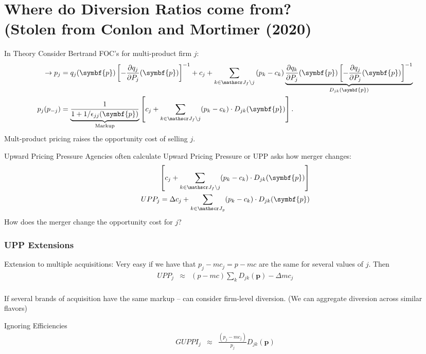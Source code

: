 \documentclass[aspectratio=169,10pt]{beamer}
\begin{document}
\section{Where do Diversion Ratios come from?\\ (Stolen from Conlon and Mortimer (2020)}
\begin{frame}{In Theory}
\footnotesize
Consider Bertrand FOC's for multi-product firm $j$:
\begin{align*}
\label{eq:best_response}
\rightarrow \nonumber p_j &=q_{j}(\symbf{p}) \left[-\frac{\partial q_{j}}{\partial P_{j}}(\symbf{p})\right]^{-1} + c_{j} + \sum_{k \in \calJ_{f} \setminus j} \left(p_{k}-c_{k}\right) \underbrace{\frac{\partial q_{k}}{\partial P_{j}}(\symbf{p})\left[-\frac{\partial q_{j}}{\partial P_{j}}(\symbf{p})\right]^{-1}}_{D_{jk}(\symbf{p})}\\
p_j(p_{-j}) &= \underbrace{\frac{1}{1+1/\epsilon_{jj}(\symbf{p})}}_{\text{Markup}} \left[ c_j + \sum_{k \in \calJ_{f} \setminus j}  (p_k-c_k) \cdot  D_{jk} (\symbf{p}) \right].
\end{align*}
Mult-product pricing \alert{raises the opportunity cost} of selling $j$.
\end{frame}

\begin{frame}{Upward Pricing Pressure}
Agencies often calculate \alert{Upward Pricing Pressure} or UPP asks how merger \alert{changes}:
\begin{align*}
\left[ c_j + \sum_{k \in \calJ_{f} \setminus j}  (p_k-c_k) \cdot  D_{jk} (\symbf{p}) \right] \\
UPP_j = \Delta c_j + \sum_{k \in \calJ_{g}}  (p_k-c_k) \cdot  D_{jk} (\symbf{p}) 
\end{align*}
How does the merger change the \alert{opportunity cost} for $j$?
\end{frame}

\begin{frame}
\frametitle{UPP Extensions}
\begin{block}{Extension to multiple acquisitions:}
Very easy if we have that $p_j - mc_j = p - mc$ are the same for several values of $j$.  Then
\begin{eqnarray*}
UPP_j &\approx& (p - mc) \sum_k D_{jk}(\symbf{p}) -  \Delta mc_j \\
\end{eqnarray*}
\end{block}
If several brands of acquisition have the same markup -- can consider firm-level diversion. (We can aggregate diversion across similar flavors)
\begin{block}{Ignoring Efficiencies}
\begin{eqnarray*}
GUPPI_j &\approx& \frac{(p_j - mc_j)}{p_j} D_{jk}(\symbf{p}) \\
\end{eqnarray*}
\end{block}
\end{frame}
\end{document}
